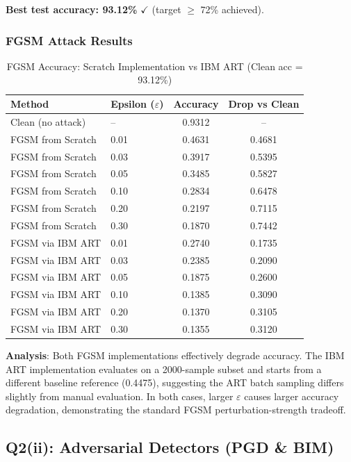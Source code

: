 \documentclass[12pt,a4paper]{article}
\begin{document}
\textbf{Best test accuracy: 93.12\%} $\checkmark$ (target $\geq$ 72\% achieved).

\subsubsection{FGSM Attack Results}

\begin{table}[H]
\centering
\caption{FGSM Accuracy: Scratch Implementation vs IBM ART (Clean acc = 93.12\%)}
\begin{tabular}{llcc}
\toprule
\textbf{Method} & \textbf{Epsilon ($\varepsilon$)} & \textbf{Accuracy} & \textbf{Drop vs Clean} \\
\midrule
Clean (no attack)   & --   & 0.9312 & -- \\
\midrule
FGSM from Scratch   & 0.01 & 0.4631 & 0.4681 \\
FGSM from Scratch   & 0.03 & 0.3917 & 0.5395 \\
FGSM from Scratch   & 0.05 & 0.3485 & 0.5827 \\
FGSM from Scratch   & 0.10 & 0.2834 & 0.6478 \\
FGSM from Scratch   & 0.20 & 0.2197 & 0.7115 \\
FGSM from Scratch   & 0.30 & 0.1870 & 0.7442 \\
\midrule
FGSM via IBM ART    & 0.01 & 0.2740 & 0.1735 \\
FGSM via IBM ART    & 0.03 & 0.2385 & 0.2090 \\
FGSM via IBM ART    & 0.05 & 0.1875 & 0.2600 \\
FGSM via IBM ART    & 0.10 & 0.1385 & 0.3090 \\
FGSM via IBM ART    & 0.20 & 0.1370 & 0.3105 \\
FGSM via IBM ART    & 0.30 & 0.1355 & 0.3120 \\
\bottomrule
\end{tabular}
\end{table}

\textbf{Analysis}: Both FGSM implementations effectively degrade accuracy. The IBM ART implementation evaluates on a 2000-sample subset and starts from a different baseline reference (0.4475), suggesting the ART batch sampling differs slightly from manual evaluation. In both cases, larger $\varepsilon$ causes larger accuracy degradation, demonstrating the standard FGSM perturbation-strength tradeoff.

\subsection{Q2(ii): Adversarial Detectors (PGD \& BIM)}
\end{document}
